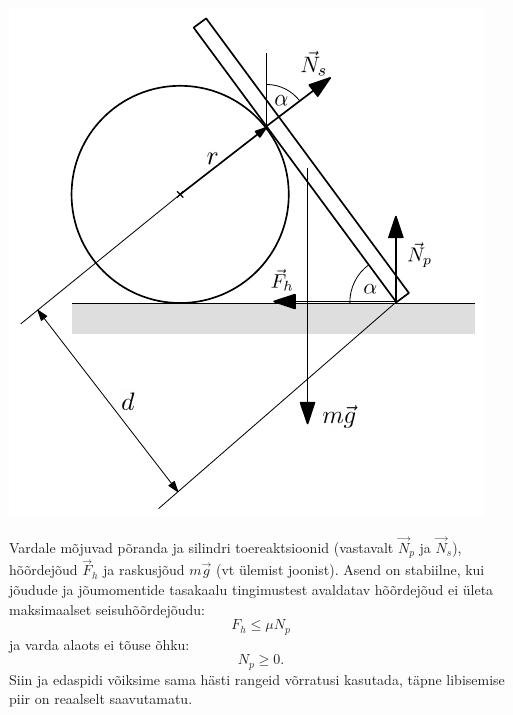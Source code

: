 \documentclass[11pt, twoside]{article}
\begin{document}
{{\ifSolution
\begin{center}
	\includegraphics[width=0.7\linewidth]{2008-v3g-09-lah1.pdf}
\end{center}

Vardale mõjuvad põranda ja silindri toereaktsioonid (vastavalt $\vec N_p$ ja $\vec N_s$), hõõrdejõud $\vec F_h$ ja raskusjõud $m\vec g$ (vt ülemist joonist). Asend on stabiilne, kui jõudude ja jõumomentide tasakaalu tingimustest avaldatav hõõrdejõud ei ületa maksimaalset seisuhõõrdejõudu:
\begin{equation} \label{2008-v3g-09:eq1}
F_{h} \leq \mu N_{p}
\end{equation}
ja varda alaots ei tõuse õhku:
\begin{equation} \label{2008-v3g-09:eq2}
N_p \geq 0.
\end{equation}
Siin ja edaspidi võiksime sama hästi rangeid võrratusi kasutada, täpne libisemise piir on reaalselt saavutamatu.

}}
\end{document}
